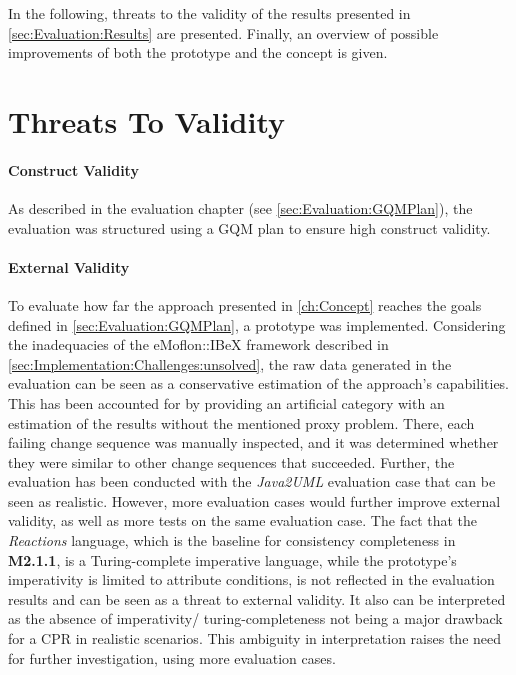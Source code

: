 In the following, threats to the validity of the results presented in \autoref{sec:Evaluation:Results} are presented.
Finally, an overview of possible improvements of both the prototype and the concept is given.

\section{Threats To Validity}
\paragraph{Construct Validity} 
As described in the evaluation chapter (see \autoref{sec:Evaluation:GQMPlan}), the evaluation was structured using a GQM plan to ensure high construct validity.

\paragraph{External Validity} To evaluate how far the approach presented in \autoref{ch:Concept} reaches the goals defined in \autoref{sec:Evaluation:GQMPlan}, a prototype was implemented. Considering the inadequacies of the eMoflon::IBeX framework described in \autoref{sec:Implementation:Challenges:unsolved}, the raw data generated in the evaluation can be seen as a conservative estimation of the approach's capabilities. This has been accounted for by providing an artificial category with an estimation of the results without the mentioned proxy problem. There, each failing change sequence was manually inspected, and it was determined whether they were similar to other change sequences that succeeded.
Further, the evaluation has been conducted with the \emph{Java2UML} evaluation case that can be seen as realistic. However, more evaluation cases would further improve external validity, as well as more tests on the same evaluation case.
The fact that the \emph{Reactions} language, which is the baseline for consistency completeness in \textbf{M2.1.1}, is a Turing-complete imperative language, while the prototype's imperativity is limited to attribute conditions, is not reflected in the evaluation results and can be seen as a threat to external validity. It also can be interpreted as the absence of imperativity/ turing-completeness not being a major drawback for a CPR in realistic scenarios. This ambiguity in interpretation raises the need for further investigation, using more evaluation cases.

